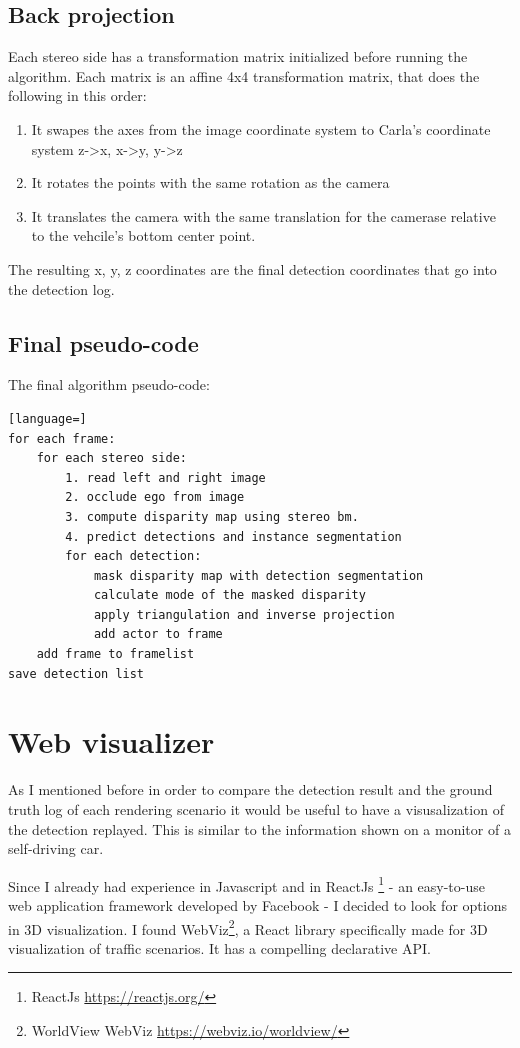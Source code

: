 \subsection{Back projection}
Each stereo side has a transformation matrix initialized before running the
algorithm. Each matrix is an affine 4x4 transformation matrix, that does the
following in this order: 
\begin{enumerate}
    \item It swapes the axes from the image coordinate system to Carla's coordinate system z->x, x->y, y->z
    \item It rotates the points with the same rotation as the camera
    \item It translates the camera with the same translation for the camerase relative to the vehcile's bottom center point.
  \end{enumerate}

The resulting x, y, z coordinates are the final detection coordinates that go into the detection log.

\subsection{Final pseudo-code}
The final algorithm pseudo-code:
\begin{lstlisting}[language=]
for each frame:
    for each stereo side:
        1. read left and right image
        2. occlude ego from image
        3. compute disparity map using stereo bm.
        4. predict detections and instance segmentation
        for each detection:
            mask disparity map with detection segmentation
            calculate mode of the masked disparity
            apply triangulation and inverse projection
            add actor to frame
    add frame to framelist
save detection list
\end{lstlisting}

\section{Web visualizer}
As I mentioned before in order to compare the detection result and the ground
truth log of each rendering scenario it would be useful to have a visusalization
of the detection replayed. This is similar to the information shown on a monitor
of a self-driving car.

Since I already had experience in Javascript and in ReactJs \footnote{ReactJs
    \url{https://reactjs.org/}} - an easy-to-use web application framework
developed by Facebook - I decided to look for options in 3D visualization. I
found WebViz\footnote{WorldView WebViz \url{https://webviz.io/worldview/}}, a
React library specifically made for 3D visualization of traffic scenarios. It
has a compelling declarative API.

